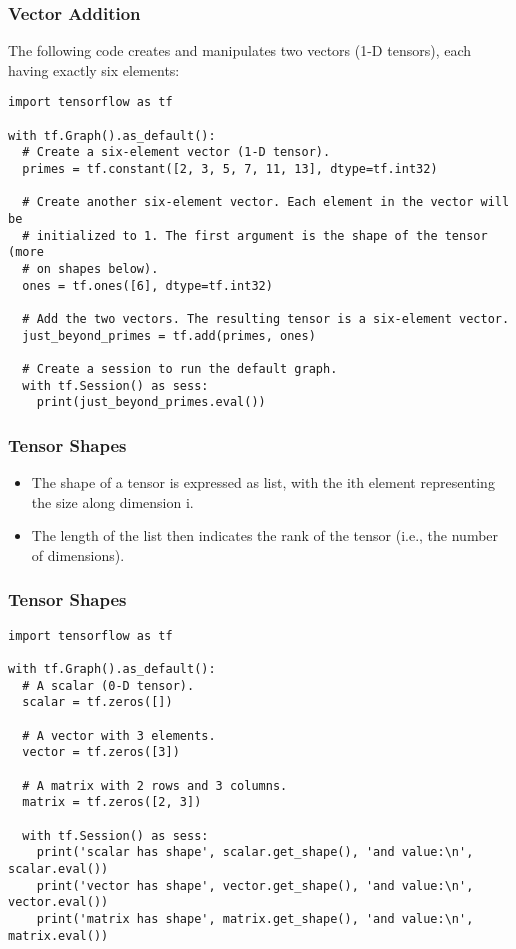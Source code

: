 \begin{frame}[fragile] \frametitle{Vector Addition}
The following code creates and manipulates two vectors (1-D tensors), each having exactly six elements:
\begin{lstlisting}
import tensorflow as tf

with tf.Graph().as_default():
  # Create a six-element vector (1-D tensor).
  primes = tf.constant([2, 3, 5, 7, 11, 13], dtype=tf.int32)

  # Create another six-element vector. Each element in the vector will be
  # initialized to 1. The first argument is the shape of the tensor (more
  # on shapes below).
  ones = tf.ones([6], dtype=tf.int32)

  # Add the two vectors. The resulting tensor is a six-element vector.
  just_beyond_primes = tf.add(primes, ones)

  # Create a session to run the default graph.
  with tf.Session() as sess:
    print(just_beyond_primes.eval())
\end{lstlisting}
\end{frame}

\begin{frame}[fragile] \frametitle{Tensor Shapes}
\begin{itemize}
\item The shape of a tensor is expressed as list, with the ith element representing the size along dimension i. 
\item The length of the list then indicates the rank of the tensor (i.e., the number of dimensions).
\end{itemize}

\end{frame}

\begin{frame}[fragile] \frametitle{Tensor Shapes}

\begin{lstlisting}
import tensorflow as tf

with tf.Graph().as_default():
  # A scalar (0-D tensor).
  scalar = tf.zeros([])

  # A vector with 3 elements.
  vector = tf.zeros([3])

  # A matrix with 2 rows and 3 columns.
  matrix = tf.zeros([2, 3])

  with tf.Session() as sess:
    print('scalar has shape', scalar.get_shape(), 'and value:\n', scalar.eval())
    print('vector has shape', vector.get_shape(), 'and value:\n', vector.eval())
    print('matrix has shape', matrix.get_shape(), 'and value:\n', matrix.eval())
\end{lstlisting}

\end{frame}




